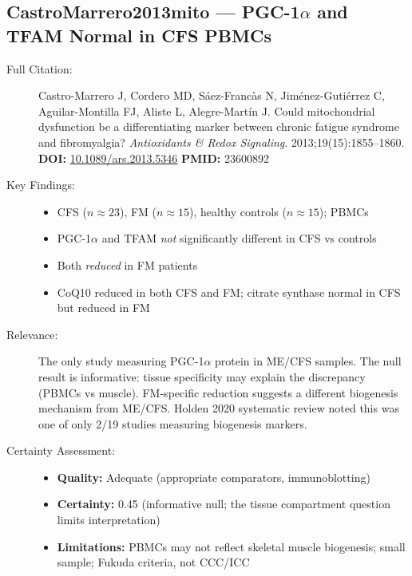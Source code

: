 \subsection*{CastroMarrero2013mito --- PGC-1\texorpdfstring{$\alpha$}{alpha} and TFAM Normal in CFS PBMCs}
\begin{description}
    \item[Full Citation:] Castro-Marrero J, Cordero MD, S\'{a}ez-Franc\`{a}s N, Jim\'{e}nez-Guti\'{e}rrez C, Aguilar-Montilla FJ, Aliste L, Alegre-Mart\'{i}n J. Could mitochondrial dysfunction be a differentiating marker between chronic fatigue syndrome and fibromyalgia? \textit{Antioxidants \& Redox Signaling}. 2013;19(15):1855--1860.\\
    \textbf{DOI:} \href{https://doi.org/10.1089/ars.2013.5346}{10.1089/ars.2013.5346} \quad \textbf{PMID:} 23600892
    \item[Key Findings:]
    \begin{itemize}
        \item CFS ($n \approx 23$), FM ($n \approx 15$), healthy controls ($n \approx 15$); PBMCs
        \item PGC-1$\alpha$ and TFAM \emph{not} significantly different in CFS vs controls
        \item Both \emph{reduced} in FM patients
        \item CoQ10 reduced in both CFS and FM; citrate synthase normal in CFS but reduced in FM
    \end{itemize}
    \item[Relevance:] The only study measuring PGC-1$\alpha$ protein in ME/CFS samples. The null result is informative: tissue specificity may explain the discrepancy (PBMCs vs muscle). FM-specific reduction suggests a different biogenesis mechanism from ME/CFS. Holden 2020 systematic review noted this was one of only 2/19 studies measuring biogenesis markers.
    \item[Certainty Assessment:]
    \begin{itemize}
        \item \textbf{Quality:} Adequate (appropriate comparators, immunoblotting)
        \item \textbf{Certainty:} 0.45 (informative null; the tissue compartment question limits interpretation)
        \item \textbf{Limitations:} PBMCs may not reflect skeletal muscle biogenesis; small sample; Fukuda criteria, not CCC/ICC
    \end{itemize}
\end{description}

